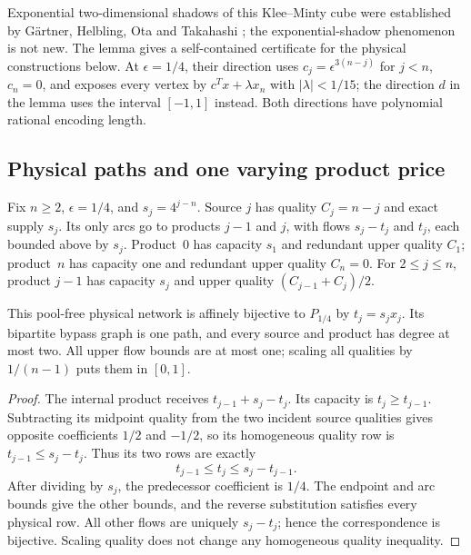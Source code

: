 Exponential two-dimensional shadows of this Klee--Minty cube were established
by G\"artner, Helbling, Ota and Takahashi
\cite[Section~4]{s6:gartner2013}; the exponential-shadow phenomenon is
not new. The lemma gives a self-contained certificate
for the physical constructions below. At $\epsilon=1/4$, their direction uses
$c_j=\epsilon^{3(n-j)}$ for $j<n$, $c_n=0$, and exposes every vertex
by $c^Tx+\lambda x_n$ with $|\lambda|<1/15$;
the direction $d$ in the lemma uses the interval $[-1,1]$ instead.
Both directions have polynomial rational encoding length.

\subsection{Physical paths and one varying product price}\label{s6:physical-paths}
Fix $n\ge2$, $\epsilon=1/4$, and $s_j=4^{j-n}$. Source $j$ has
quality $C_j=n-j$ and exact supply $s_j$. Its only arcs go to products
$j-1$ and $j$, with flows $s_j-t_j$ and $t_j$, each bounded above by
$s_j$. Product~0 has capacity $s_1$ and redundant upper quality $C_1$;
product~$n$ has capacity one and redundant upper quality $C_n=0$.
For $2\le j\le n$, product $j-1$ has capacity $s_j$ and upper quality
$(C_{j-1}+C_j)/2$.

\begin{proposition}\label{s6:path-realization}
This pool-free physical network is affinely bijective to $P_{1/4}$ by
$t_j=s_jx_j$. Its bipartite bypass graph is one path, and every source
and product has degree at most two. All upper flow bounds are at most
one; scaling all qualities by $1/(n-1)$ puts them in $[0,1]$.
\end{proposition}
\begin{proof}
The internal product receives $t_{j-1}+s_j-t_j$. Its capacity is
$t_j\ge t_{j-1}$. Subtracting its midpoint quality from the two
incident source qualities gives opposite coefficients $1/2$ and
$-1/2$, so its homogeneous quality row is
$t_{j-1}\le s_j-t_j$. Thus its two rows are exactly
\begin{equation}
 t_{j-1}\le t_j\le s_j-t_{j-1}.\label{s6:physical-strip}
\end{equation}
After dividing by $s_j$, the predecessor coefficient is $1/4$.
The endpoint and arc bounds give the other bounds, and the reverse
substitution satisfies every physical row. All other flows are uniquely
$s_j-t_j$; hence the correspondence is bijective. Scaling quality does
not change any homogeneous quality inequality.
\end{proof}

